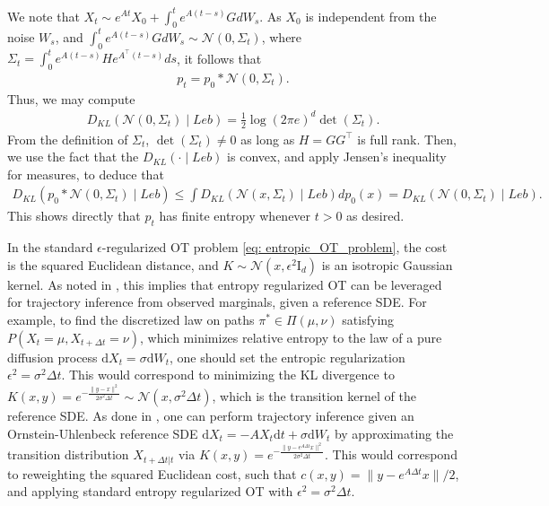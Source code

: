 \documentclass[twoside,11pt]{article}
\newcommand{\Id}{\mathrm{I}_d}
\newcommand{\indep}{\perp\!\!\!\!\perp}
\begin{document}
We note that $X_t \sim e^{At}X_0 + \int_{0}^{t} e^{A(t-s)}GdW_s$.
As $X_0$ is independent from the noise $W_s$, and $\int_{0}^{t} e^{A(t-s)}GdW_s \sim \mathcal{N}(0, \Sigma_t)$, where $\Sigma_t = \int_0^t e^{A(t-s)}He^{A^\top (t-s)}ds$, it follows that 
\begin{align*}
p_t = p_0 * \mathcal{N}(0, \Sigma_t).
\end{align*}
Thus, we may compute \cite[Theorem 9.4.1]{cover1999elements}
\begin{align*}
D_{KL} (\mathcal{N}(0, \Sigma_t) \mid Leb) = \frac12 \log(2\pi e)^d \det(\Sigma_t).
\end{align*}
From the definition of $\Sigma_t$, $\det(\Sigma_t) \neq 0$ as long as $H = GG^\top$ is full rank. Then, we use the fact that the $D_{KL}(\cdot \mid Leb)$ is convex, and apply Jensen's inequality for measures, to deduce that 
\begin{align*}
D_{KL}(p_0 * \mathcal{N}(0, \Sigma_t)\mid Leb) \leq \int D_{KL} (\mathcal{N}(x, \Sigma_t) \mid Leb) dp_0 (x) =  D_{KL} (\mathcal{N}(0, \Sigma_t) \mid Leb).
\end{align*}
This shows directly that $p_t$ has finite entropy whenever $t>0$ as desired.


\begin{remark}
\label{rmk: EOT_for_traj_inf}
In the standard $\epsilon$-regularized OT problem \eqref{eq: entropic_OT_problem}, the cost is the squared Euclidean distance, and $K \sim \mathcal{N}(x, \epsilon^2 \Id)$ is an isotropic Gaussian kernel. As noted in \citet{lavenant2021towards}, this implies that entropy regularized OT can be leveraged for trajectory inference from observed marginals, given a reference SDE. For example, to find the discretized law on paths $\pi^* \in \Pi(\mu, \nu)$ satisfying $P(X_t = \mu, X_{t+\Delta t} = \nu)$, which minimizes relative entropy to the law of a pure diffusion process $\mathrm{d}X_t = \sigma \mathrm{d}W_t$, one should set the entropic regularization $\epsilon^2 = \sigma^2 \Delta t$. This would correspond to minimizing the KL divergence to {$K(x,y)= e^{-\frac{\|y-x\|^2}{2 \sigma^2 \Delta t}} \sim \mathcal{N}(x, \sigma^2 \Delta t)$}, which is the transition kernel of the reference SDE. As done in \citet{zhang2024joint}, one can perform trajectory inference given an Ornstein-Uhlenbeck reference SDE $\mathrm{d}X_t = -A X_t \mathrm{d}t+ \sigma \mathrm{d}W_t$ by approximating the transition distribution $X_{t+\Delta t| t}$ via $K(x,y)= e^{-\frac{\|y - e^{A \Delta t} x\|^2}{2 \sigma^2 \Delta t}}$. This would correspond to reweighting the squared Euclidean cost, such that $c(x,y) = \|y-e^{A\Delta t}x\|/2$, and applying standard entropy regularized OT with $\epsilon^2 = \sigma^2\Delta t$. 
\end{remark}
\end{document}
